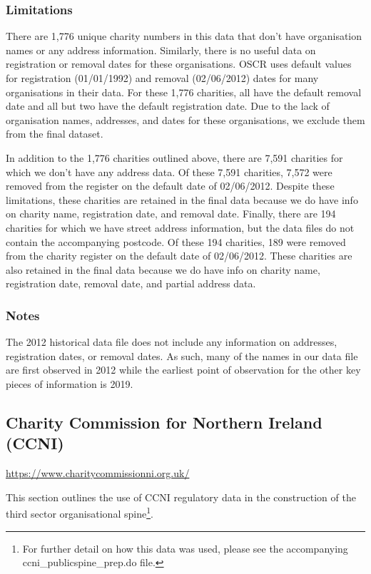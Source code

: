 \documentclass{article}
\begin{document}
\subsubsection{Limitations}
There are 1,776 unique charity numbers in this data that don’t have organisation names or any
address information. Similarly, there is no useful data on registration or removal dates for these
organisations.   OSCR   uses   default   values   for   registration   (01/01/1992)   and   removal
(02/06/2012) dates for many organisations in their data. For these 1,776 charities, all have the
default removal date and all but two have the default registration date. Due to the lack of
organisation names, addresses, and dates for these organisations, we exclude them from the
final dataset. 

In addition to the 1,776 charities outlined above, there are 7,591 charities for which we don’t
have any address data. Of these 7,591 charities, 7,572 were removed from the register on the
default date of 02/06/2012. Despite these limitations, these charities are retained in the final
data because we do have info on charity name, registration date, and removal date.
Finally, there are 194 charities for which we have street address information, but the data files
do not contain the accompanying postcode. Of these 194 charities, 189 were removed from the
charity register on the default date of 02/06/2012. These charities are also retained in the final
data because we do have info on charity name, registration date, removal date, and partial
address data. 

\subsubsection{Notes}
The 2012 historical data file does not include any information on addresses, registration dates,
or removal dates. As such, many of the names in our data file are first observed in 2012 while
the earliest point of observation for the other key pieces of information is 2019.

\clearpage
\subsection{Charity Commission for Northern Ireland (CCNI)}
\url{https://www.charitycommissionni.org.uk/}

This section outlines the use of CCNI regulatory data in the construction of the third sector
organisational spine\footnote{For further detail on how this data was used, please see the accompanying
ccni\_publicspine\_prep.do file.}.
\end{document}
